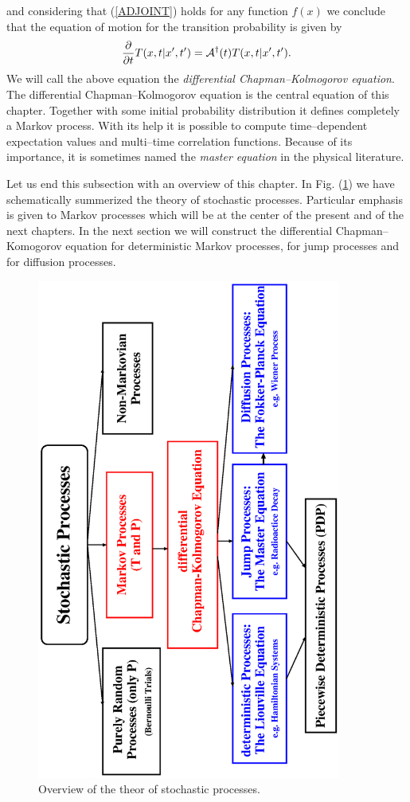 and considering that (\ref{ADJOINT}) holds for any 
function $f(x)$ we conclude that the equation of motion for the 
transition probability is given by
\begin{equation}
\label{KOL_FORWARD}
\frac{\partial}{\partial t} T(x,t|x',t') =
{\cal{A}}^{\dagger}(t) T(x,t|x',t').
\end{equation}
We will call the above equation the {\em differential 
Chapman--Kolmogorov equation}. The differential 
Chapman--Kolmogorov equation is the central equation of this 
chapter. Together with some initial probability distribution it 
defines completely a Markov process. With its help it is possible
to compute time--dependent expectation values and multi--time 
correlation functions. Because of its importance, it is sometimes
named the {\em master equation} in the physical literature.


Let us end this subsection with an overview of this chapter. In Fig. 
(\ref{F_CHAP$_OVERVIEW}) we have schematically summerized the theory
of stochastic processes.  Particular emphasis is given to Markov
processes
which will be at the center of the present and of the next chapters.
In the next section we will construct
the differential Chapman--Komogorov equation for deterministic Markov 
processes, for jump processes and for diffusion processes.
\begin{figure}
\label{F_CHAP$_OVERVIEW}
\includegraphics[width=10cm]{./Figures/f_chap4_overview.eps}
\caption{Overview of the theor of stochastic processes.}
\end{figure}

